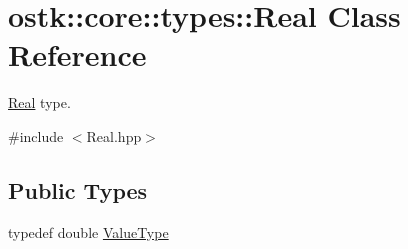 \hypertarget{classostk_1_1core_1_1types_1_1_real}{}\section{ostk\+:\+:core\+:\+:types\+:\+:Real Class Reference}
\label{classostk_1_1core_1_1types_1_1_real}


\hyperlink{classostk_1_1core_1_1types_1_1_real}{Real} type.  




{\ttfamily \#include $<$Real.\+hpp$>$}

\subsection*{Public Types}
\begin{DoxyCompactItemize}
\item 
typedef double \hyperlink{classostk_1_1core_1_1types_1_1_real_aa26f796c30b514c98d573f82e3b02296}{Value\+Type}
\end{DoxyCompactItemize}
